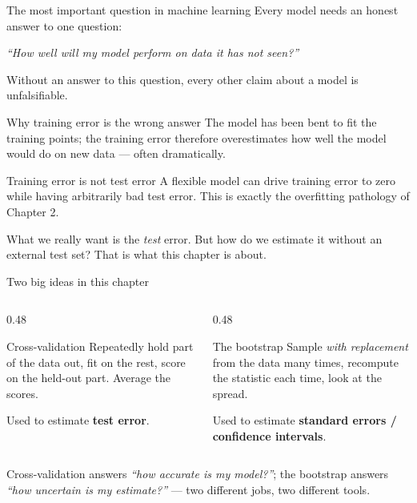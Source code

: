 \documentclass[aspectratio=169,11pt]{beamer}
\begin{document}
\begin{frame}{The most important question in machine learning}
  Every model needs an honest answer to one question:
  \begin{takeaway}
    \emph{``How well will my model perform on data it has not seen?''}
  \end{takeaway}
  Without an answer to this question, every other claim about a model
  is unfalsifiable.
\end{frame}

\begin{frame}{Why training error is the wrong answer}
  The model has been bent to fit the training points; the training
  error therefore overestimates how well the model would do on new
  data --- often dramatically.
  \begin{alertblock}{Training error is not test error}
    A flexible model can drive training error to zero while having
    arbitrarily bad test error. This is exactly the overfitting
    pathology of Chapter 2.
  \end{alertblock}
  \begin{takeaway}
    What we really want is the \emph{test} error. But how do we
    estimate it without an external test set? That is what this
    chapter is about.
  \end{takeaway}
\end{frame}

\begin{frame}{Two big ideas in this chapter}
  \begin{columns}[T]
    \begin{column}{0.48\textwidth}
      \begin{block}{Cross-validation}
        Repeatedly hold part of the data out, fit on the rest, score
        on the held-out part. Average the scores.
      \end{block}
      Used to estimate \textbf{test error}.
    \end{column}
    \begin{column}{0.48\textwidth}
      \begin{block}{The bootstrap}
        Sample \emph{with replacement} from the data many times,
        recompute the statistic each time, look at the spread.
      \end{block}
      Used to estimate \textbf{standard errors / confidence
      intervals}.
    \end{column}
  \end{columns}
  \begin{readme}
    Cross-validation answers \emph{``how accurate is my model?''};
    the bootstrap answers \emph{``how uncertain is my estimate?''} ---
    two different jobs, two different tools.
  \end{readme}
\end{frame}
\end{document}
